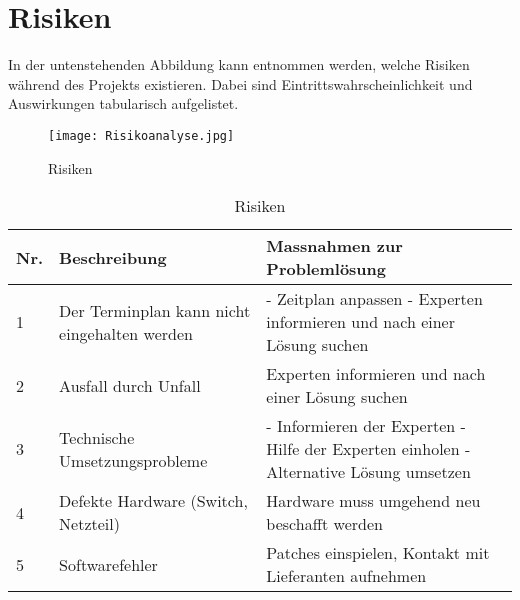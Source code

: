 
\section{Risiken}
In der untenstehenden Abbildung kann entnommen werden, welche Risiken während des Projekts existieren. Dabei sind  Eintrittswahrscheinlichkeit und Auswirkungen tabularisch aufgelistet.
\begin{figure}[htb]
\centering
\texttt{[image: Risikoanalyse.jpg]}
\caption{Risiken}
\label{fig:Risk}
\end{figure} 

\begin{table}[H]
\centering
\begin{tabular}{p{1cm}p{6cm}p{9cm}}
\hline
\rowcolor{heading} \textbf{Nr.} & \textbf{Beschreibung} & \textbf{Massnahmen zur Problemlösung} \\\hline
1 & Der Terminplan kann nicht eingehalten werden & - Zeitplan anpassen \newline - Experten informieren und nach einer Lösung suchen \\\hline
2 & Ausfall durch Unfall & Experten informieren und nach einer Lösung suchen  \\\hline
3 & Technische Umsetzungsprobleme & - Informieren der Experten \newline - Hilfe der Experten einholen \newline - Alternative Lösung umsetzen \\\hline
4 & Defekte Hardware (Switch, Netzteil) & Hardware muss umgehend neu beschafft werden  \\\hline
5 & Softwarefehler & Patches einspielen, Kontakt mit Lieferanten aufnehmen  \\\hline
\end{tabular}
\caption{Risiken}
\end{table}


